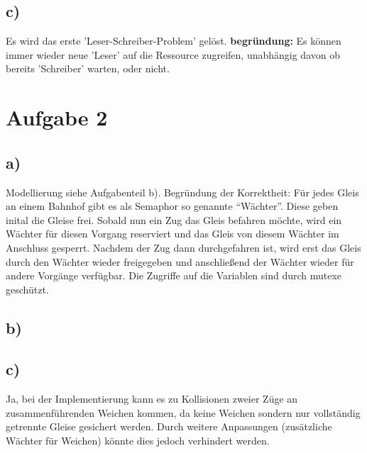 \documentclass[11pt,a4paper,DIV=10,]{scrartcl}
\begin{document}
\subsection*{c)}
Es wird das erste 'Leser-Schreiber-Problem' gelöst. \textbf{begründung:} Es können immer wieder neue 'Leser' auf die Ressource zugreifen, unabhängig davon ob bereits 'Schreiber' warten, oder nicht.
\section*{Aufgabe 2}
\subsection*{a)}
Modellierung siehe Aufgabenteil b). Begründung der Korrektheit: Für jedes Gleis an einem Bahnhof gibt es als Semaphor so genannte ``Wächter''. Diese geben inital die Gleise frei. Sobald nun ein Zug das Gleis befahren möchte, wird ein Wächter für diesen Vorgang reserviert und das Gleis von diesem Wächter im Anschluss gesperrt. Nachdem der Zug dann durchgefahren ist, wird erst das Gleis durch den Wächter wieder freigegeben und anschließend der Wächter wieder für andere Vorgänge verfügbar. Die Zugriffe auf die Variablen sind durch mutexe geschützt. 
\subsection*{b)}

\subsection*{c)}
Ja, bei der Implementierung kann es zu Kollisionen zweier Züge an zusammenführenden Weichen kommen, da keine Weichen sondern nur vollständig getrennte Gleise gesichert werden. Durch weitere Anpassungen (zusätzliche Wächter für Weichen) könnte dies jedoch verhindert werden. 
\end{document}
